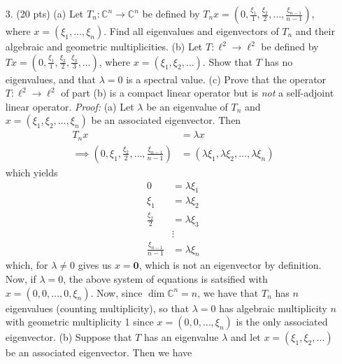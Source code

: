 \documentclass{article}
\begin{document}
\begin{itemize}
    \pagebreak
    \item[3.] (20 pts) (a) Let $T_n : \mathbb{C}^n \to \mathbb{C}^n$ be defined by $T_nx = \left(0, \frac{\xi_1}{1}, \frac{\xi_2}{2}, \dots, \frac{\xi_{n-1}}{n-1}\right)$, where $x = (\xi_1, \dots, \xi_n)$. Find all eigenvalues and eigenvectors of $T_n$ and their algebraic and geometric multiplicities.
    \newline
    (b) Let $T: \ell^2 \to \ell^2$ be defined by $Tx = \left(0, \frac{\xi_1}{1}, \frac{\xi_2}{2}, \frac{\xi_3}{3},\dots\right)$, where $x = (\xi_1, \xi_2, \dots)$. Show that $T$ has no eigenvalues, and that $\lambda = 0$ is a spectral value. 
    \newline
    (c) Prove that the operator $T: \ell^2 \to \ell^2$ of part (b) is a compact linear operator but is \textit{not} a self-adjoint linear operator.
    \newline\newline
    \textit{Proof:} (a) Let $\lambda$ be an eigenvalue of $T_n$ and $x = (\xi_1,\xi_2,\dots, \xi_n)$ be an associated eigenvector. Then
    \begin{align*}
        T_nx &= \lambda x\\
        \implies \left(0, \xi_1, \frac{\xi_2}{2}, \dots, \frac{\xi_{n-1}}{n-1}\right) &= (\lambda \xi_1, \lambda\xi_2,\dots, \lambda\xi_n)
    \end{align*}
    which yields
    \begin{align*}
        0 &= \lambda \xi_1\\
        \xi_1 &= \lambda \xi_2\\
        \frac{\xi_2}{2} &= \lambda \xi_3\\
        &\vdots\\
        \frac{\xi_{n-1}}{n-1} &= \lambda \xi_n
    \end{align*}
    which, for $\lambda \neq 0$ gives us $x = \mathbf{0}$, which is not an eigenvector by definition. Now, if $\lambda = 0$, the above system of equations is satsified with $x = (0,0,\dots, 0, \xi_n)$. Now, since $\dim{\mathbb{C}^n} = n$, we have that $T_n$ has $n$ eigenvalues (counting multiplicity), so that $\lambda = 0$ has algebraic multiplicity $n$ with geometric multiplicity 1 since $x = (0, 0, \dots, \xi_n)$ is the only associated eigenvector.
    \newline\newline
    (b) Suppose that $T$ has an eigenvalue $\lambda$ and let $x = (\xi_1, \xi_2,\dots)$ be an associated eigenvector. Then we have
    \begin{align*}

\end{align*}
\end{itemize}
\end{document}
